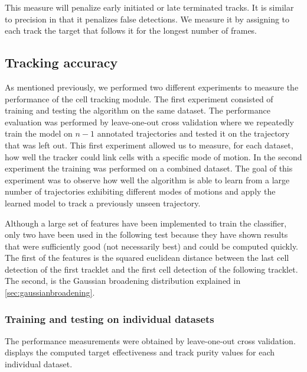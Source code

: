 	This measure will penalize early initiated or late terminated tracks. It is similar to precision in that it penalizes false detections. We measure it by assigning to each track the target that follows it for the longest number of frames. 
	
	\subsection{Tracking accuracy}
	
	
		As mentioned previously, we performed two different experiments to measure the performance of the cell tracking module. The first experiment consisted of training and testing the algorithm on the same dataset. The performance evaluation was performed by leave-one-out cross validation where we repeatedly train the model on $n-1$ annotated trajectories and tested it on the trajectory that was left out. This first experiment allowed us to measure, for each dataset, how well the tracker could link cells with a specific mode of motion. In the second experiment the training was performed on a combined dataset. The goal of this experiment was to observe how well the algorithm is able to learn from a large number of trajectories exhibiting different modes of motions and apply the learned model to track a previously unseen trajectory.
		
		Although a large set of features have been implemented to train the classifier, only two have been used in the following test because they have shown results that were sufficiently good (not necessarily best) and could be computed quickly. The first of the features is the squared euclidean distance between the last cell detection of the first tracklet and the first cell detection of the following tracklet. The second, is the Gaussian broadening distribution explained in \cref{sec:gaussianbroadening}.
	
		\subsubsection{Training and testing on individual datasets}
		
		The performance measurements were obtained by leave-one-out cross validation.  displays the computed target effectiveness and track purity values for each individual dataset.
		
